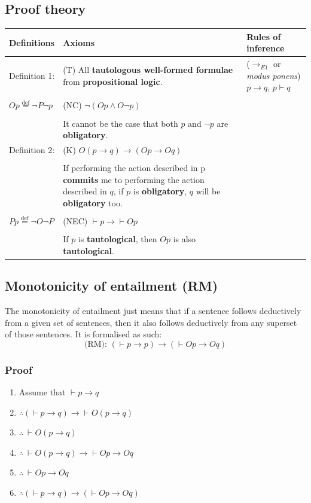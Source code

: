 \documentclass[11pt]{article}
\newcommand{\defequal}{\stackrel{\scriptscriptstyle\mathrm{def}}{=}}
\begin{document}
\subsection{Proof theory}
\label{sec:org3613337}
\begin{center}
\begin{tabularx}{\textwidth}{|X|X|X|}
\hline
Definitions & Axioms & Rules of inference\\
\hline
Definition 1: & (T) All \textbf{tautologous well-formed formulae} from \textbf{propositional logic}. & (\(\rightarrow_{E1}\) or \emph{modus ponens}) \(p \rightarrow q\), \(p \vdash q\)\\
 &  & \\
\(Op \defequal \neg P \neg p\) & (NC) \(\neg (Op \wedge O \neg p)\) & \\
 &  & \\
 & It cannot be the case that both \(p\) and \(\neg p\) are \textbf{obligatory}. & \\
\hline
Definition 2: & (K) \(O(p \rightarrow q) \rightarrow (Op \rightarrow Oq)\) & \\
 &  & \\
 & If performing the action described in p \textbf{commits} me to performing the action described in \(q\), if \(p\) is \textbf{obligatory}, \(q\) will be \textbf{obligatory} too. & \\
 &  & \\
\(Pp \defequal \neg O \neg P\) & (NEC) \(\vdash p \rightarrow \vdash Op\) & \\
 &  & \\
 & If \(p\) is \textbf{tautological}, then \(Op\) is also \textbf{tautological}. & \\
\hline
\end{tabularx}
\end{center}

 \newpage
\subsection{Monotonicity of entailment (RM)}
\label{sec:orgc91e23c}
The monotonicity of entailment just means that if a sentence follows deductively from a given set of sentences, then it also follows deductively from any superset of those sentences. It is formalised as such:
\[\text{(RM): } (\vdash p \rightarrow p) \rightarrow (\vdash Op \rightarrow Oq)\]
\subsubsection{Proof}
\label{sec:orga752664}
\begin{enumerate}
\item Assume that \(\vdash p \rightarrow q\)
\item \(\therefore (\vdash p \rightarrow q) \rightarrow \vdash O(p \rightarrow q)\)
\item \(\therefore \ \vdash O(p \rightarrow q)\)
\item \(\therefore \ \vdash O(p \rightarrow q) \rightarrow \vdash Op \rightarrow Oq\)
\item \(\therefore \ \vdash Op \rightarrow Oq\)
\item \(\therefore (\vdash p \rightarrow q) \rightarrow (\vdash Op \rightarrow Oq)\)
\end{enumerate}
\end{document}
